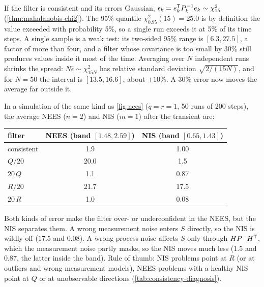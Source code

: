 \begin{solutions}
  \item If the filter is consistent and its errors Gaussian, $\epsilon_k = e_k^{\mathsf{T}} P_k^{-1} e_k \sim \chi^2_{15}$ (\cref{thm:mahalanobis-chi2}). The 95\% quantile $\chi^2_{0.95}(15) = 25.0$ is
        by definition the value exceeded with probability 5\%, so a single run exceeds it at 5\% of its time steps. A single sample is a weak test:
        its two-sided 95\% range is $[6.3, 27.5]$, a factor of more than four, and a filter whose covariance is too small by 30\% still produces values
        inside it most of the time. Averaging over $N$ independent runs shrinks the spread: $N\bar\epsilon \sim \chi^2_{15N}$ has relative standard deviation
        $\sqrt{2/(15N)}$, and for $N = 50$ the interval is $[13.5, 16.6]$, about $\pm10\%$. A 30\% error now moves the average far outside it.

  \item In a simulation of the same kind as \cref{fig:nees} ($q = r = 1$, 50 runs of 200 steps), the average NEES ($n = 2$) and NIS ($m = 1$) after the
        transient are:
        \begin{center}\small
        \begin{tabular}{@{}l c c@{}}
        \toprule
        filter & NEES (band $[1.48, 2.59]$) & NIS (band $[0.65, 1.43]$) \\
        \midrule
        consistent & 1.9 & 1.00 \\
        $Q/20$ & 20.0 & 1.5 \\
        $20\,Q$ & 1.1 & 0.87 \\
        $R/20$ & 21.7 & 17.5 \\
        $20\,R$ & 1.0 & 0.08 \\
        \bottomrule
        \end{tabular}
        \end{center}
        Both kinds of error make the filter over- or underconfident in the NEES, but the NIS separates them. A wrong measurement noise enters $S$
        directly, so the NIS is wildly off ($17.5$ and $0.08$). A wrong process noise affects $S$ only through $HP^-H^{\mathsf{T}}$, which the measurement noise partly
        masks, so the NIS moves much less ($1.5$ and $0.87$, the latter inside the band). Rule of thumb: NIS problems point at $R$ (or at outliers and
        wrong measurement models), NEES problems with a healthy NIS point at $Q$ or at unobservable directions (\cref{tab:consistency-diagnosis}).


\end{solutions}
